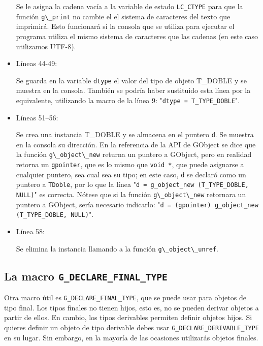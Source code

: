 \begin{itemize}
  Se le asigna la cadena vacía a la variable de estado \texttt{LC\_CTYPE} para que la función
  \passthrough{\lstinline!g\_print!} no cambie el el sistema de caracteres del texto que imprimirá.
  Esto funcionará si la consola que se utiliza para ejecutar el programa utiliza el mismo sistema de caracteres
  que las cadenas (en este caso utilizamos UTF-8).
\item Líneas 44-49:\par
  Se guarda en la variable \texttt{dtype} el valor del tipo de objeto \textsf{T\_DOBLE} y se muestra en la consola.
  También se podría haber sustituido esta línea por la equivalente, utilizando la macro de la línea 9:
  "\texttt{dtype = T\_TYPE\_DOBLE}".
\item Líneas 51--56:\par
  Se crea una instancia \textsf{T\_DOBLE} y se almacena en el puntero \texttt{d}. Se muestra en la consola su
  dirección. En la referencia de la API de \textsf{GObject} se dice que la función
  \passthrough{\lstinline!g\_object\_new!} returna un puntero a \textsf{GObject}, pero en realidad retorna un
  \texttt{gpointer}, que es lo mismo que \texttt{void *}, que puede asignarse a cualquier puntero, sea cual sea
  su tipo; en este caso, \texttt{d} se declaró como un puntero a \texttt{TDoble}, por lo que la línea
  "\texttt{d = g\_object\_new (T\_TYPE\_DOBLE, NULL)}" es correcta. Nótese que si la función
  \passthrough{\lstinline!g\_object\_new!} retornara un puntero a \textsf{GObject}, sería necesario indicarlo:
  "\texttt{d = (gpointer) g\_object\_new (T\_TYPE\_DOBLE, NULL)}".
\item Línea 58:\par
  Se elimina la instancia llamando a la función \passthrough{\lstinline!g\_object\_unref!}.
\end{itemize}

\subsection{La macro \texttt{G\_DECLARE\_FINAL\_TYPE}}
Otra macro útil es \texttt{G\_DECLARE\_FINAL\_TYPE}, que se puede usar para objetos de tipo final.
Los tipos finales no tienen hijos, esto es, no se pueden derivar objetos a partir de ellos.
En cambio, los tipos derivables permiten definir objetos hijos. Si quieres definir un objeto de tipo
derivable debes usar \texttt{G\_DECLARE\_DERIVABLE\_TYPE} en su lugar. Sin embargo, en la mayoría de
las ocasiones utilizarás objetos finales.

